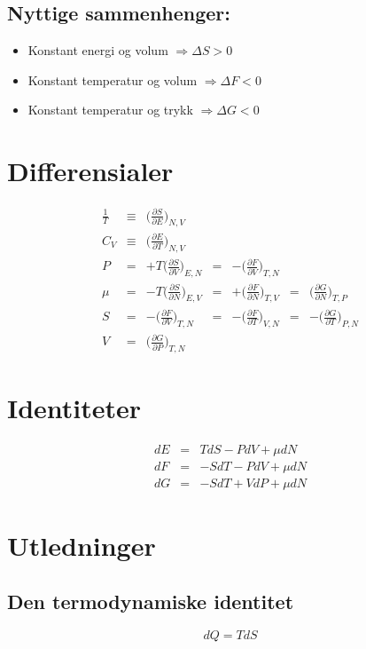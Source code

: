 \documentclass{article}
\begin{document}
\begin{multicols}{2}
\subsection*{Nyttige sammenhenger:}
\begin{itemize}
\item Konstant energi og volum \newline
$\Rightarrow\Delta S>0$
\item Konstant temperatur og volum \newline
$\Rightarrow\Delta F<0$
\item Konstant temperatur og trykk \newline
$\Rightarrow\Delta G<0$
\end{itemize}

\section*{Differensialer}
$$\begin{aligned}
\frac{1}{T}&\equiv&\bigg(\frac{\partial S}{\partial E}\bigg)_{N,V}\\
C_V&\equiv&\bigg(\frac{\partial E}{\partial T}\bigg)_{N,V}\\
P&=&+T\bigg(\frac{\partial S}{\partial V}\bigg)_{E,N}&=&-\bigg(\frac{\partial F}{\partial V}\bigg)_{T,N}\\
\mu&=&-T\bigg(\frac{\partial S}{\partial N}\bigg)_{E,V}&=&+\bigg(\frac{\partial F}{\partial N}\bigg)_{T,V}&=&\bigg(\frac{\partial G}{\partial N}\bigg)_{T,P}\\
S&=&-\bigg(\frac{\partial F}{\partial V}\bigg)_{T,N}&=&-\bigg(\frac{\partial F}{\partial T}\bigg)_{V,N}&=&-\bigg(\frac{\partial G}{\partial T}\bigg)_{P,N}\\
V&=&\bigg(\frac{\partial G}{\partial P}\bigg)_{T,N}
\end{aligned}$$

\section*{Identiteter}
$$\begin{aligned}
dE&=&TdS-PdV+\mu dN\\
dF&=&-SdT-PdV+\mu dN\\
dG&=&-SdT+VdP+\mu dN
\end{aligned}$$

\section*{Utledninger}
\subsection*{Den termodynamiske identitet}
$$dQ=TdS$$

\end{multicols}
\end{document}
